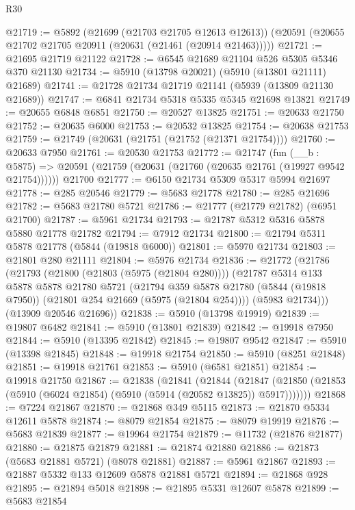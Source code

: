 \begin{lexlean}{R30}
\begin{coremodule}
@21719 := @5892
    (@21699 (@21703 @21705 @12613 @12613))
    (@20591 (@20655 @21702 @21705 @20911 (@20631 (@21461 (@20914 @21463)))))
@21721 := @21695 @21719 @21122
@21728 := @6545 @21689 @21104 @526 @5305 @5346 @370 @21130
@21734 := @5910 (@13798 @20021) (@5910 (@13801 @21111) @21689)
@21741 := @21728 @21734 @21719 @21141 (@5939 (@13809 @21130 @21689))
@21747 := @6841 @21734 @5318 @5335 @5345 @21698 @13821
@21749 := @20655 @6848 @6851
@21750 := @20527 @13825
@21751 := @20633 @21750
@21752 := @20635 @6000
@21753 := @20532 @13825
@21754 := @20638 @21753
@21759 := @21749 (@20631 (@21751 (@21752 (@21371 @21754))))
@21760 := @20633 @7950
@21761 := @20530 @21753
@21772 := @21747
    (fun (__b : @5875) => @20591 (@21759 (@20631 (@21760 (@20635 @21761 (@19927 @9542 @21754))))))
    @21700
@21777 := @6150 @21734 @5309 @5317 @5994 @21697
@21778 := @285 @20546
@21779 := @5683 @21778
@21780 := @285 @21696
@21782 := @5683 @21780 @5721
@21786 := @21777 (@21779 @21782) (@6951 @21700)
@21787 := @5961 @21734
@21793 := @21787 @5312 @5316 @5878 @5880 @21778 @21782
@21794 := @7912 @21734
@21800 := @21794 @5311 @5878 @21778 (@5844 (@19818 @6000))
@21801 := @5970 @21734
@21803 := @21801 @280 @21111
@21804 := @5976 @21734
@21836 := @21772
    (@21786
      (@21793
        (@21800 (@21803 (@5975 (@21804 @280))))
        (@21787
          @5314
          @133
          @5878
          @5878
          @21780
          @5721
          (@21794
            @359
            @5878
            @21780
            (@5844 (@19818 @7950))
            (@21801 @254 @21669 (@5975 (@21804 @254))))
          (@5983 @21734)))
      (@13909 @20546 @21696))
@21838 := @5910 (@13798 @19919)
@21839 := @19807 @6482
@21841 := @5910 (@13801 @21839)
@21842 := @19918 @7950
@21844 := @5910 (@13395 @21842)
@21845 := @19807 @9542
@21847 := @5910 (@13398 @21845)
@21848 := @19918 @21754
@21850 := @5910 (@8251 @21848)
@21851 := @19918 @21761
@21853 := @5910 (@6581 @21851)
@21854 := @19918 @21750
@21867 := @21838
    (@21841
      (@21844
        (@21847 (@21850 (@21853 (@5910 (@6024 @21854) (@5910 (@5914 (@20582 @13825)) @5917)))))))
@21868 := @7224 @21867
@21870 := @21868 @349 @5115
@21873 := @21870 @5334 @12611 @5878
@21874 := @8079 @21854
@21875 := @8079 @19919
@21876 := @5683 @21839
@21877 := @19964 @21754
@21879 := @11732 (@21876 @21877)
@21880 := @21875 @21879
@21881 := @21874 @21880
@21886 := @21873 (@5683 @21881 @5721) (@8078 @21881)
@21887 := @5961 @21867
@21893 := @21887 @5332 @133 @12609 @5878 @21881 @5721
@21894 := @21868 @928
@21895 := @21894 @5018
@21898 := @21895 @5331 @12607 @5878
@21899 := @5683 @21854

\end{coremodule}
\end{lexlean}
